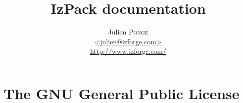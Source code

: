 \documentclass[a4paper, 12pt]{report}
\title{\Huge{\textbf{IzPack documentation}}}
\author{Julien \textsc{Ponge} \\
				\url{<julien@izforge.com>} \\
				\url{http://www.izforge.com/}}
\begin{document}
	\maketitle
	\tableofcontents
	
	
	
	
  
  
  
  
  \appendix
  \chapter{The GNU General Public License}
  \footnotesize
  
  \normalsize
\end{document}
